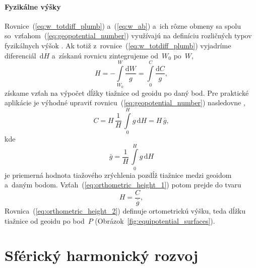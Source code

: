 \documentclass[a4paper, 12pt]{book}
\newcommand{\diff}{\mathrm d}
\begin{document}
\subsubsection{Fyzikálne výšky}
\label{sec:physical_heights}

Rovnice~(\ref{eq:w_totdiff_plumb}) a~(\ref{eq:w_ab}) a~ich rôzne obmeny sa 
spolu so~vzťahom~(\ref{eq:geopotential_number}) využívajú na definíciu 
rozličných typov fyzikálnych výšok \parencite[pozri 
napríklad][]{MoritzPhysicalGeodesy,SansoGeodeticHeights}.  Ak totiž 
z~rovnice~(\ref{eq:w_totdiff_plumb}) vyjadríme diferenciál~$\diff H$ a~získanú 
rovnicu zintegrujeme od~$W_0$ po~$W$,
%
\begin{equation}
\label{eq:orthometric_height_1}
H = -\int\limits_{W_0}^{W} \frac{\diff W}{g} = \int\limits_{0}^{C} \frac{\diff 
C}{g}{,}
\end{equation}
%
získame vzťah na výpočet dĺžky tiažnice od geoidu po daný bod.  Pre praktické 
aplikácie je výhodné upraviť rovnicu~(\ref{eq:geopotential_number}) nasledovne 
\parencite{MoritzPhysicalGeodesy},
%
\begin{equation}
C = H \, \frac{1}{H} \, \int\limits_0^H g \, \diff H = H \, \bar{g}{,}
\end{equation}
%
kde
%
\begin{equation}
\bar{g} = \frac{1}{H} \, \int\limits_0^H g \, \diff H
\end{equation}
%
je priemerná hodnota tiažového zrýchlenia pozdĺž tiažnice medzi geoidom a~daným 
bodom.  Vzťah~(\ref{eq:orthometric_height_1}) potom prejde do tvaru
%
\begin{equation}
\label{eq:orthometric_height_2}
H = \frac{C}{\bar{g}}{,}
\end{equation}
%
Rovnica~(\ref{eq:orthometric_height_2}) definuje ortometrickú výšku, teda dĺžku 
tiažnice od geoidu po bod~$P$ (Obrázok~\ref{fig:equipotential_surfaces}).







\chapter{Sférický harmonický rozvoj}
\label{sec:spherical_harmonic_expansion}
\end{document}

